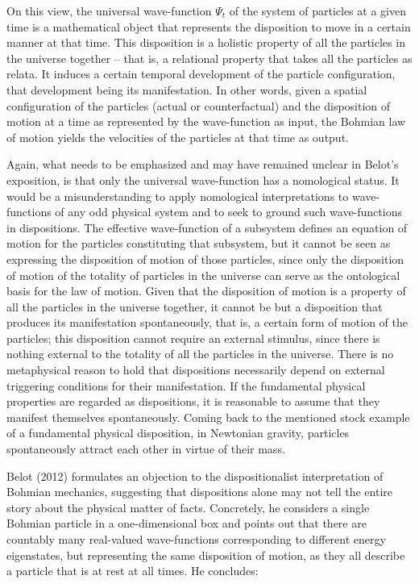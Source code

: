 \documentclass[12pt]{article}
\theoremstyle{definition}
\begin{document}
\noindent On this view, the universal wave-function $\Psi_t$ of the system of particles at a given time is a mathematical object that represents the disposition to move in a certain manner at that time. This disposition is a holistic property of all the particles in the universe together -- that is, a relational property that takes all the particles as relata. It induces a certain temporal development of the particle configuration, that development being its manifestation. In other words, given a spatial configuration of the particles (actual or counterfactual) and the disposition of motion at a time as represented by the wave-function as input, the Bohmian law of motion yields the velocities of the particles at that time as output.

Again, what needs to be emphasized and may have remained unclear in Belot's exposition, is that only the universal wave-function has a nomological status. It would be a misunderstanding to apply nomological interpretations to wave-functions of any odd physical system and to seek to ground such wave-functions in dispositions. The effective wave-function of a subsystem defines an equation of motion for the particles constituting that subsystem, but it cannot be seen as expressing the disposition of motion of those particles, since only the disposition of motion of the totality of particles in the universe can serve as the ontological basis for the law of motion.
Given that the disposition of motion is a property of all the particles in the universe together, it cannot be but a disposition that produces its manifestation spontaneously, that is, a certain form of motion of the particles; this disposition cannot require an external stimulus, since there is nothing external to the totality of all the particles in the universe. There is no metaphysical reason to hold that dispositions necessarily depend on external triggering conditions for their manifestation. If the fundamental physical properties are regarded as dispositions, it is reasonable to assume that they manifest themselves spontaneously. Coming back to the mentioned stock example of a fundamental physical disposition, in Newtonian gravity, particles spontaneously attract each other in virtue of their mass.

Belot (2012) formulates an objection to the dispositionalist interpretation of Bohmian mechanics, suggesting that dispositions alone may not tell the entire story about the physical matter of facts. Concretely, he considers a single Bohmian particle in a one-dimensional box and points out that there are countably many real-valued wave-functions corresponding to different energy eigenstates, but representing the same disposition of motion, as they all describe a particle that is at rest at all times. He concludes:
\end{document}
